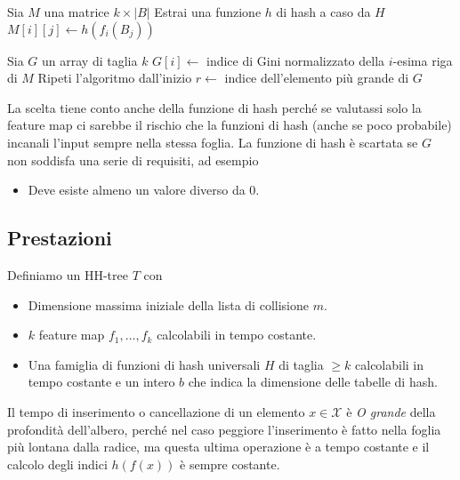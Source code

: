 \documentclass[a4paper]{article}
\begin{document}
\begin{algorithm}[H]
	\DontPrintSemicolon

	\;


	Sia $M$ una matrice $k \times |B|$ \;
	Estrai una funzione $h$ di hash a caso da $H$ \;
	 {
		 {
			$M[i][j] \gets h(f_i(B_j))$ \;
		}
	}

	Sia $G$ un array di taglia $k$ \;
	 {
		$G[i] \gets$ indice di Gini normalizzato della $i$-esima riga di $M$ \;
	}
	 {
		Ripeti l'algoritmo dall'inizio \;
	}
	$r \gets$ indice dell'elemento più grande di $G$ \;


	\;

\end{algorithm}
La scelta tiene conto anche della funzione di hash perché se valutassi solo la feature map ci sarebbe il rischio che la funzioni di hash (anche se poco probabile) incanali l'input sempre nella stessa foglia. La funzione di hash è scartata se $G$ non soddisfa una serie di requisiti, ad esempio
\begin{itemize}
	\item Deve esiste almeno un valore diverso da 0.
\end{itemize}

\subsection*{Prestazioni}

Definiamo un HH-tree $T$ con
\begin{itemize}
	\item Dimensione massima iniziale della lista di collisione $m$.
	\item $k$ feature map $f_1, \ldots, f_k$ calcolabili in tempo costante.
	\item Una famiglia di funzioni di hash universali $H$ di taglia $\geq k$ calcolabili in tempo costante e un intero $b$ che indica la dimensione delle tabelle di hash.
\end{itemize}
Il tempo di inserimento o cancellazione di un elemento $x \in \mathcal{X}$ è \textit{O grande} della profondità dell'albero, perché nel caso peggiore l'inserimento è fatto nella foglia più lontana dalla radice, ma questa ultima operazione è a tempo costante e il calcolo degli indici $h(f(x))$ è sempre costante.
\end{document}
